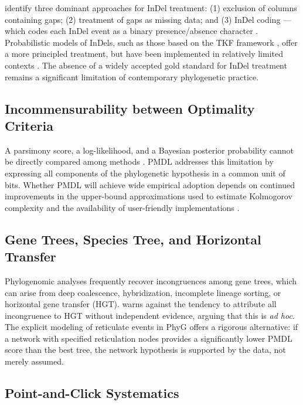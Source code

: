 \textcite{redelings2024} identify three dominant approaches for InDel treatment: (1) exclusion of columns containing gaps; (2) treatment of gaps as missing data; and (3) InDel coding --- which codes each InDel event as a binary presence/absence character \parencite{simmons2007}. Probabilistic models of InDels, such as those based on the TKF framework \parencite{thornekishinofelsenstein1991}, offer a more principled treatment, but have been implemented in relatively limited contexts \parencite{redelings2024}. The absence of a widely accepted gold standard for InDel treatment remains a significant limitation of contemporary phylogenetic practice.

\subsection{Incommensurability between Optimality Criteria}

A parsimony score, a log-likelihood, and a Bayesian posterior probability cannot be directly compared among methods \parencite{wheelervaron2025}. PMDL addresses this limitation by expressing all components of the phylogenetic hypothesis in a common unit of bits. Whether PMDL will achieve wide empirical adoption depends on continued improvements in the upper-bound approximations used to estimate Kolmogorov complexity and the availability of user-friendly implementations \parencite{wheelervaron2025}.

\subsection{Gene Trees, Species Tree, and Horizontal Transfer}

Phylogenomic analyses frequently recover incongruences among gene trees, which can arise from deep coalescence, hybridization, incomplete lineage sorting, or horizontal gene transfer (HGT). \textcite{wheeler2012} warns against the tendency to attribute all incongruence to HGT without independent evidence, arguing that this is \textit{ad hoc}. The explicit modeling of reticulate events in PhyG \parencite{wheeleretal2024} offers a rigorous alternative: if a network with specified reticulation nodes provides a significantly lower PMDL score than the best tree, the network hypothesis is supported by the data, not merely assumed.

\subsection{Point-and-Click Systematics}

